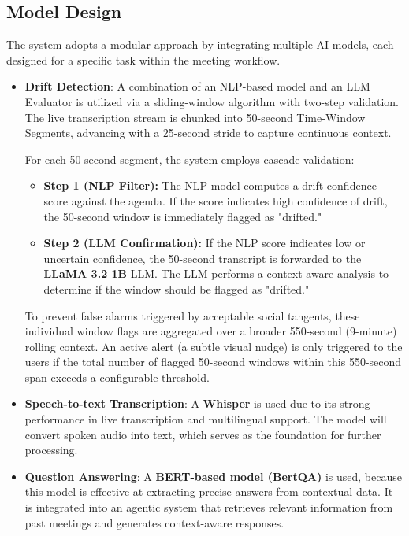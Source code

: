 \subsection{Model Design}
{
    \setlength{\parindent}{2em}
    The system adopts a modular approach by integrating multiple AI models, each designed for a specific task within the meeting workflow.
    \begin{itemize}
        \item \textbf{Drift Detection}: A combination of an NLP-based model and an LLM Evaluator is utilized via a sliding-window algorithm with two-step validation. The live transcription stream is chunked into 50-second Time-Window Segments, advancing with a 25-second stride to capture continuous context. 
        
        For each 50-second segment, the system employs cascade validation:
        \begin{itemize}
            \item \textbf{Step 1 (NLP Filter):} The NLP model computes a drift confidence score against the agenda. If the score indicates high confidence of drift, the 50-second window is immediately flagged as "drifted." 
            \item \textbf{Step 2 (LLM Confirmation):} If the NLP score indicates low or uncertain confidence, the 50-second transcript is forwarded to the \textbf{LLaMA 3.2 1B} LLM. The LLM performs a context-aware analysis to determine if the window should be flagged as "drifted."
        \end{itemize}
        To prevent false alarms triggered by acceptable social tangents, these individual window flags are aggregated over a broader 550-second (9-minute) rolling context. An active alert (a subtle visual nudge) is only triggered to the users if the total number of flagged 50-second windows within this 550-second span exceeds a configurable threshold.
        \item \textbf{Speech-to-text Transcription}: A \textbf{Whisper} is used due to its strong performance in live transcription and multilingual support.
              The model will convert spoken audio into text, which serves as the foundation for further processing.
        \item \textbf{Question Answering}: A \textbf{BERT-based model (BertQA)} is used,
              because this model is effective at extracting precise answers from contextual data.
              It is integrated into an agentic system that retrieves relevant information from past meetings and generates context-aware responses.

\end{itemize}}
